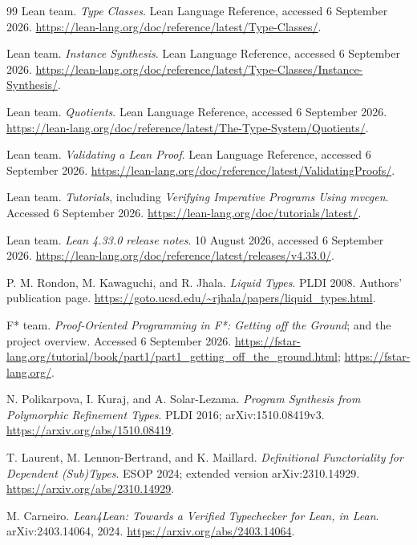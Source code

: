 \documentclass[11pt,a4paper]{article}
\theoremstyle{definition}
\theoremstyle{remark}
\begin{document}
\begin{thebibliography}{99}
 Lean team. \emph{Type Classes}. Lean Language Reference, accessed 6 September 2026.\newline
\url{https://lean-lang.org/doc/reference/latest/Type-Classes/}.

 Lean team. \emph{Instance Synthesis}. Lean Language Reference, accessed 6 September 2026.\newline
\url{https://lean-lang.org/doc/reference/latest/Type-Classes/Instance-Synthesis/}.

 Lean team. \emph{Quotients}. Lean Language Reference, accessed 6 September 2026.\newline
\url{https://lean-lang.org/doc/reference/latest/The-Type-System/Quotients/}.

 Lean team. \emph{Validating a Lean Proof}. Lean Language Reference, accessed 6 September 2026.\newline
\url{https://lean-lang.org/doc/reference/latest/ValidatingProofs/}.

 Lean team. \emph{Tutorials}, including \emph{Verifying Imperative Programs Using mvcgen}. Accessed 6 September 2026.\newline
\url{https://lean-lang.org/doc/tutorials/latest/}.

 Lean team. \emph{Lean 4.33.0 release notes}. 10 August 2026, accessed 6 September 2026.\newline
\url{https://lean-lang.org/doc/reference/latest/releases/v4.33.0/}.

 P. M. Rondon, M. Kawaguchi, and R. Jhala. \emph{Liquid Types}. PLDI 2008. Authors' publication page.\newline
\url{https://goto.ucsd.edu/~rjhala/papers/liquid_types.html}.

 F* team. \emph{Proof-Oriented Programming in F*: Getting off the Ground}; and the project overview. Accessed 6 September 2026.\newline
\url{https://fstar-lang.org/tutorial/book/part1/part1_getting_off_the_ground.html}; \url{https://fstar-lang.org/}.

 N. Polikarpova, I. Kuraj, and A. Solar-Lezama. \emph{Program Synthesis from Polymorphic Refinement Types}. PLDI 2016; arXiv:1510.08419v3.\newline
\url{https://arxiv.org/abs/1510.08419}.

 T. Laurent, M. Lennon-Bertrand, and K. Maillard. \emph{Definitional Functoriality for Dependent (Sub)Types}. ESOP 2024; extended version arXiv:2310.14929.\newline
\url{https://arxiv.org/abs/2310.14929}.

 M. Carneiro. \emph{Lean4Lean: Towards a Verified Typechecker for Lean, in Lean}. arXiv:2403.14064, 2024.\newline
\url{https://arxiv.org/abs/2403.14064}.

\end{thebibliography}
\end{document}
